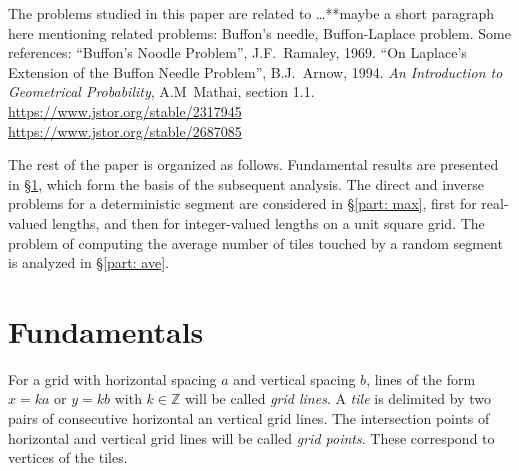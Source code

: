 \documentclass[12pt, a4paper]{article}
\begin{document}

The problems studied in this paper are related to \ldots ***maybe a short paragraph here mentioning related problems: Buffon's needle, Buffon-Laplace problem. Some references: ``Buffon's Noodle Problem'', J.F.~Ramaley, 1969. ``On Laplace's Extension of the Buffon Needle Problem'', B.J.~Arnow, 1994. \emph{An Introduction to Geometrical Probability}, A.M~Mathai, section 1.1. \\
\url{https://www.jstor.org/stable/2317945} \\
\url{https://www.jstor.org/stable/2687085}

The rest of the paper is organized as follows. Fundamental results are presented in \S\ref{part: fund results}, which form the basis of the subsequent analysis. The direct and inverse problems for a deterministic segment are considered in \S\ref{part: max}, first for real-valued lengths, and then for integer-valued lengths on a unit square grid. The problem of computing the average number of tiles touched by a random segment is analyzed in \S\ref{part: ave}.



\section{Fundamentals}
\label{part: fund results}

For a grid with horizontal spacing $a$ and vertical spacing $b$, lines of the form $x = ka$ or $y = kb$ with $k \in \mathbb Z$ will be called \emph{grid lines}. A \emph{tile} is delimited by two pairs of consecutive horizontal an vertical grid lines. The intersection points of horizontal and vertical grid lines will be called \emph{grid points}. These correspond to vertices of the tiles.
\end{document}
